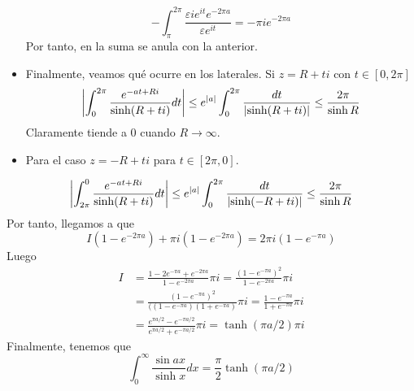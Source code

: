 \documentclass[twoside]{article}
\begin{document}
\begin{solucion}
\begin{itemize}
$$
- \int_{\pi}^{2\pi} \frac{\varepsilon i e^{i t} e^{-2\pi a}}{\varepsilon e^{i t}} = - \pi i e^{-2\pi a}
$$
Por tanto, en la suma se anula con la anterior.
\item Finalmente, veamos qué ocurre en los laterales. Si $z=R +ti$ con $t\in [0,2\pi]$
\begin{align*}
\left\lvert\int_0^{2\pi} \frac{e^{-at+Ri}}{\sinh(R+ti)}dt\right\rvert \leq  e^{|a|}\int_0^{2\pi}\frac{dt}{\left\lvert\sinh(R+ti)\right\rvert} \leq  \frac{2\pi}{\sinh R}
\end{align*}
Claramente tiende a $0$ cuando $R\to \infty$.
\item Para el caso $z=-R+ti$ para $t\in[2\pi,0]$.
\end{itemize}
\begin{align*}
\left\lvert\int_{2\pi}^0 \frac{e^{-at+Ri}}{\sinh(R+ti)}dt\right\rvert \leq  e^{|a|}\int_0^{2\pi}\frac{dt}{\left\lvert\sinh(-R+ti)\right\rvert} \leq \frac{2\pi}{\sinh R}
\end{align*}
Por tanto, llegamos a que
$$
I(1-e^{-2\pi a }) + \pi i (1 - e^{-2\pi a})=2\pi i (1-e^{-\pi a})
$$
Luego 
\begin{align*}
I &=  \frac{1 - 2e^{-\pi a}+e^{-2\pi a}}{1-e^{-2 \pi a}}\pi i= \frac{(1-e^{-\pi a})^2}{1-e^{-2\pi a}}\pi i \\
&= \frac{(1-e^{-\pi a})^2}{((1-e^{-\pi a})(1+e^{-\pi a})}\pi i=  \frac{1-e^{-\pi a}}{1+e^{-\pi a}}\pi i \\
&= \frac{e^{\pi a/2}-e^{-\pi a/2}}{e^{\pi a/2}+e^{-\pi a/2}}\pi i = \tanh(\pi a /2) \pi i
\end{align*}
Finalmente, tenemos que
$$
\int_0^\infty \frac{\sin ax}{\sinh x}dx  = \frac{\pi}{2}\tanh(\pi a /2)
$$
\end{solucion}
\newpage
\end{document}
